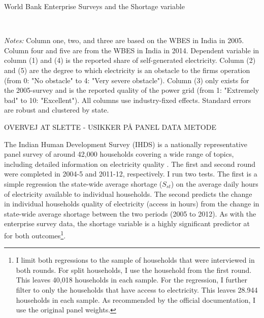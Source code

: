 \documentclass[11pt]{article}
\begin{document}
\begin{table}
    \caption{World Bank Enterprise Surveys and the Shortage variable}
    \label{tab:wbes}
    \begin{minipage}{0.95\textwidth} 

    \\
    { \footnotesize \textit{Notes:} Column one, two, and three are based on the WBES in India in 2005. Column four and five are from the WBES in India in 2014. Dependent variable in column (1) and (4) is the reported share of self-generated electricity. Column (2) and (5) are the degree to which electricity is an obstacle to the firms operation (from 0: "No obstacle" to 4: "Very severe obstacle"). Column (3) only exists for the 2005-survey and is the reported quality of the power grid (from 1: "Extremely bad" to 10: "Excellent"). All columns use industry-fixed effects. Standard errors are robust and clustered by state. \\
\par}
    \end{minipage}
\end{table}   

% 


% 

OVERVEJ AT SLETTE - USIKKER PÅ PANEL DATA METODE

The Indian Human Development Survey (IHDS) is a nationally representative panel survey of around 42,000 households covering a wide range of topics, including detailed information on electricity quality \citep{desai_india_2018-1,desai_india_2018}. The first and second round were completed in 2004-5 and 2011-12, respectively. I run two tests. The first is a simple regression the state-wide average shortage (\(S_{st}\)) on the average daily hours of electricity available to individual households. The second predicts the change in individual households quality of electricity (access in hours) from the change in state-wide average shortage between the two periods (2005 to 2012). As with the enterprise survey data, the shortage variable is a highly significant predictor at for both outcomes\footnote{I limit both regressions to the sample of households that were interviewed in both rounds. For split households, I use the household from the first round. This leaves 40,018 households in each sample. For the regression, I further filter to only the households that have access to electricity. This leaves 28.944 households in each sample. As recommended by the official documentation, I use the original panel weights.}.
\end{document}

